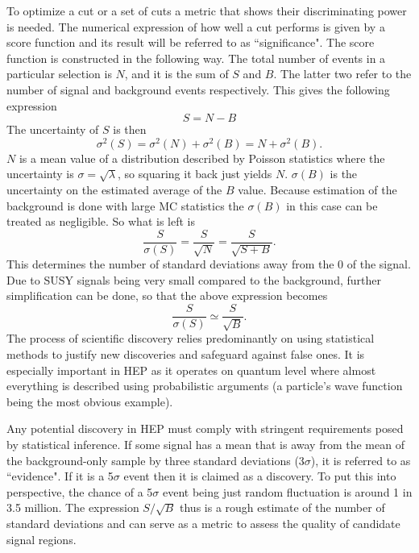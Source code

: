 To optimize a cut or a set of cuts a metric that shows their discriminating power is needed. The numerical expression of how well a cut performs is given by a score function and its result will be referred to as ``significance". The score function is constructed in the following way.
The total number of events in a particular selection is $N$, and it is the sum of $S$ and $B$. The latter two refer to the number of signal and background events respectively. This gives the following expression
\begin{equation}
S = N -B
\end{equation}
The uncertainty of $S$ is then
\begin{equation}
\sigma^2(S) = \sigma^2(N) + \sigma^2(B) = N+\sigma^2(B).
\end{equation}
$N$ is a mean value of a distribution described by Poisson statistics where the uncertainty is $\sigma = \sqrt{\lambda}$, so squaring it back just yields $N$. 
$\sigma(B)$ is the uncertainty on the estimated average of the $B$ value. 
Because estimation of the background is done with large MC statistics the $\sigma(B)$ in this case can be treated as negligible. So what is left is
\begin{equation}
\frac{S}{\sigma(S)} = \frac{S}{\sqrt{N}} = \frac{S}{\sqrt{S+B}}.
\end{equation}
This determines the number of standard deviations away from the 0 of the signal. Due to SUSY signals being very small compared to the background, further simplification can be done, so that the above expression becomes
\begin{equation}
\frac{S}{\sigma(S)}\simeq \frac{S}{\sqrt{B}}.
\end{equation} 
\hbox{}
The process of scientific discovery relies predominantly on using statistical methods to justify new discoveries and safeguard against false ones. It is especially important in HEP as it operates on quantum level where almost everything is described using probabilistic arguments (a particle's wave function being the most obvious example).
  
Any potential discovery in HEP must comply with stringent requirements posed by statistical inference. If some signal has a mean that is away from the mean of the background-only sample by three standard deviations (3$\sigma$), it is referred to as ``evidence". If it is a 5$\sigma$ event then it is claimed as a discovery. To put this into perspective, the chance of a 5$\sigma$ event being just random fluctuation is around 1 in 3.5 million. 
The expression $S/\sqrt{B}$ thus is a rough estimate of the number of standard deviations and can serve as a metric to assess the quality of candidate signal regions. 

